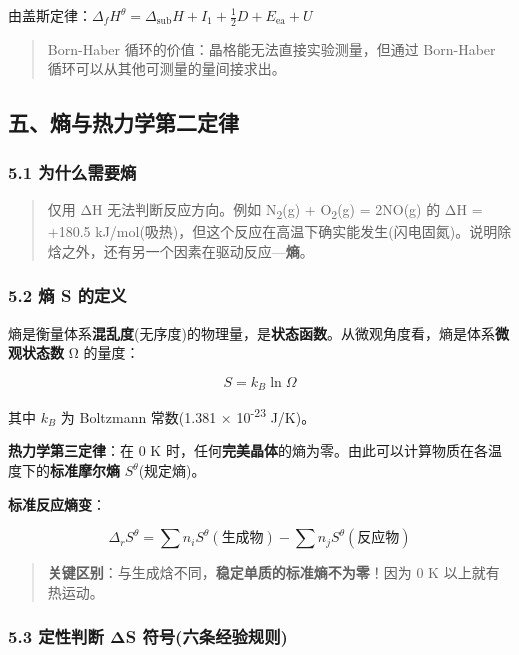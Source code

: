 \documentclass[a4paper,11pt]{ctexart}
\newcommand{\箭}{\ensuremath{\rightarrow}}
\newcommand{\左箭}{\ensuremath{\leftarrow}}
\newcommand{\上箭}{\ensuremath{\uparrow}}
\newcommand{\下箭}{\ensuremath{\downarrow}}
\newcommand{\衡}{\ensuremath{\rightleftharpoons}}
\newcommand{\双箭}{\ensuremath{\leftrightarrow}}
\newcommand{\约等于}{\ensuremath{\approx}}
\newcommand{\小于等于}{\ensuremath{\leq}}
\newcommand{\大于等于}{\ensuremath{\geq}}
\newcommand{\不等于}{\ensuremath{\neq}}
\newcommand{\西格马}{\ensuremath{\sigma}}
\newcommand{\派}{\ensuremath{\pi}}
\begin{document}
由盖斯定律：\(\Delta_f H^\theta = \Delta_{\text{sub}}H + I_1 + \frac{1}{2}D + E_{\text{ea}} + U\)

\begin{quote}
Born-Haber 循环的价值：晶格能无法直接实验测量，但通过 Born-Haber 循环可以从其他可测量的量间接求出。
\end{quote}

\subsection{五、熵与热力学第二定律}\label{ux4e94ux71b5ux4e0eux70edux529bux5b66ux7b2cux4e8cux5b9aux5f8b}

\subsubsection{5.1 为什么需要熵}\label{ux4e3aux4ec0ux4e48ux9700ux8981ux71b5}

\begin{quote}
仅用 ΔH 无法判断反应方向。例如 N\textsubscript{2}(g) + O\textsubscript{2}(g) = 2NO(g) 的 ΔH = +180.5 kJ/mol(吸热)，但这个反应在高温下确实能发生(闪电固氮)。说明除焓之外，还有另一个因素在驱动反应---\textbf{熵}。
\end{quote}

\subsubsection{5.2 熵 S 的定义}\label{ux71b5-s-ux7684ux5b9aux4e49}

熵是衡量体系\textbf{混乱度}(无序度)的物理量，是\textbf{状态函数}。从微观角度看，熵是体系\textbf{微观状态数} Ω 的量度：

\[
S = k_B \ln \Omega
\]

其中 \(k_B\) 为 Boltzmann 常数(1.381 × 10\textsuperscript{-23} J/K)。

\textbf{热力学第三定律}：在 0 K 时，任何\textbf{完美晶体}的熵为零。由此可以计算物质在各温度下的\textbf{标准摩尔熵} \(S^\theta\)(规定熵)。

\textbf{标准反应熵变}：

\[
\Delta_r S^\theta = \sum n_i S^\theta(\text{生成物}) - \sum n_j S^\theta(\text{反应物})
\]

\begin{quote}
\textbf{关键区别}：与生成焓不同，\textbf{稳定单质的标准熵不为零}！因为 0 K 以上就有热运动。
\end{quote}

\subsubsection{5.3 定性判断 ΔS 符号(六条经验规则)}\label{ux5b9aux6027ux5224ux65ad-ux3b4s-ux7b26ux53f7ux516dux6761ux7ecfux9a8cux89c4ux5219}
\end{document}
